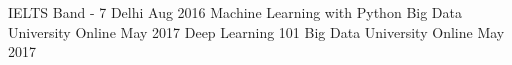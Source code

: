 \begin{cvhonors}
  \cvhonor
    {IELTS}
    {Band - 7}
    {Delhi}
    {Aug 2016}
  \cvhonor
    {Machine Learning with Python}
    {Big Data University}
    {Online}
    {May 2017}
  \cvhonor
	{Deep Learning 101}
	{Big Data University}
	{Online}
	{May 2017}

\end{cvhonors}